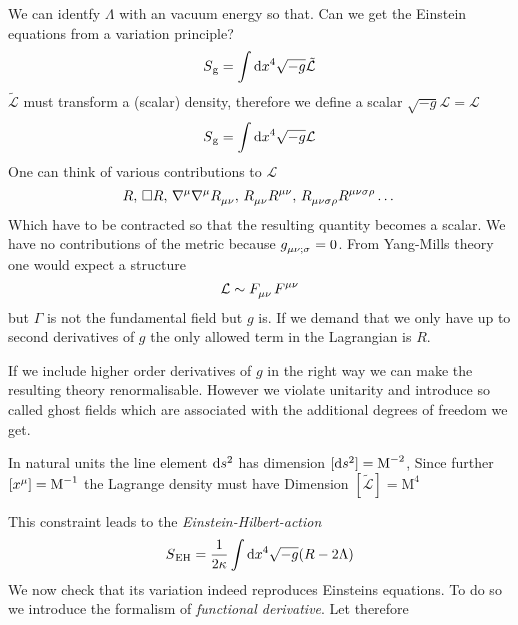 We can identfy $\Lambda$ with an vacuum energy so that. Can we get the Einstein
equations from a variation principle?
\begin{equation}
S\textsubscript{g}=\int\dif x^4 \sqrt{-g}\tilde{\mathcal{L}}
\end{equation}
$\tilde{\mathcal{L}}$ must transform a (scalar) density, therefore we define a
scalar $\sqrt{-g}\mathcal{L}=\mathcal{L}$
\begin{equation}
S\textsubscript{g}=\int\dif x^4 \sqrt{-g}\mathcal{L}
\end{equation}
One can think of various contributions to $\mathcal{L}$
\begin{equation*}
R,\, \square
R,\,\tensor{\nabla}{^\mu}\tensor{\nabla}{^\mu}\tensor{R}{_\mu_\nu},\,
\tensor{R}{_\mu_\nu}\tensor{R}{^\mu^\nu}
,\,\tensor{R}{_\mu_\nu_\sigma_\rho}\tensor{R}{^\mu^\nu^\sigma^\rho}\dots
\end{equation*}
Which have to be contracted so that the resulting quantity becomes a scalar.
We have no contributions of the metric because
$\tensor{g}{_\mu_\nu_{;\sigma}}=0$. From Yang-Mills theory one would expect a
structure
\begin{equation}
\mathcal{L}\sim\tensor{F}{_\mu_\nu}\tensor{F}{^\mu^\nu}
\end{equation}
but $\Gamma$ is not the fundamental field but $g$ is. If we demand that we only
have up to second derivatives of $g$ the only allowed term in the Lagrangian is
$R$.
\begin{sidenote}
If we include higher order derivatives of $g$ in the right way we can make the
resulting theory renormalisable. However we violate unitarity and introduce so
called ghost fields which are associated with the additional degrees of freedom
we get.
\end{sidenote}
\begin{remark}[Dimensions]
In natural units the line element $\dif s^2$ has dimension ${[\dif
s^2]=\textrm{M}^{-2}}$, Since further
${\left[\tensor{x}{^\mu}\right]=\textrm{M}^{-1}}$ the Lagrange density must have Dimension ${\left[\tilde{\mathcal{L}}\right]=\textrm{M}^{4}}$
\end{remark}
This constraint leads to the \emph{Einstein-Hilbert-action}
\begin{equation}
S\textsubscript{EH}=\frac{1}{2\kappa}\int\dif x^4 \sqrt{-g}(R-2\Lambda)
\end{equation}
We now check that its variation indeed reproduces Einsteins equations. To do
so we introduce the formalism of \emph{functional derivative}. Let therefore
